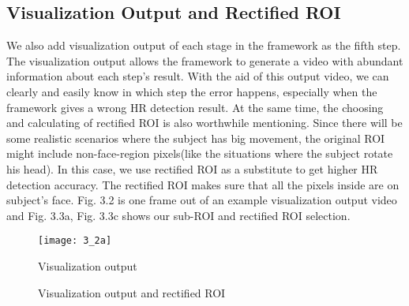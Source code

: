 \subsection{Visualization Output and Rectified ROI}
We also add visualization output of each stage in the framework as the fifth step. The visualization output allows the framework to generate a video with abundant information about each step's result. With the aid of this output video, we can clearly and easily know in which step the error happens, especially when the framework gives a wrong HR detection result. At the same time, the choosing and calculating of rectified ROI is also worthwhile mentioning. Since there will be some realistic scenarios where the subject has big movement, the original ROI might include non-face-region pixels(like the situations where the subject rotate his head). In this case, we use rectified ROI as a substitute to get higher HR detection accuracy. The rectified ROI makes sure that all the pixels inside are on subject's face. Fig. 3.2 is one frame out of an example visualization output video and Fig. 3.3a, Fig. 3.3c shows our sub-ROI and rectified ROI selection.

\begin{figure}[ht]
\centering
\texttt{[image: 3\_2a]}
\caption{Visualization output}\label{fig:noted-figure}
\end{figure}

\begin{figure}[ht]
\hspace{-0.3in}
\caption{Visualization output and rectified ROI }\label{fig:noted-figure}
\end{figure}

